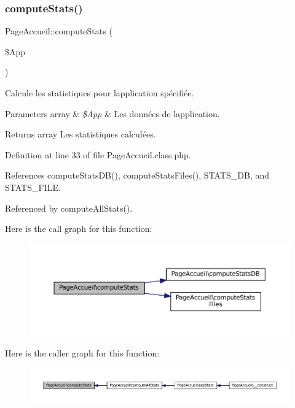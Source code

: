 \subsubsection{\texorpdfstring{compute\+Stats()}{computeStats()}}
{\footnotesize\ttfamily Page\+Accueil\+::compute\+Stats (\begin{DoxyParamCaption}\item[{}]{\$\+App }\end{DoxyParamCaption})\hspace{0.3cm}{\ttfamily [protected]}}

Calcule les statistiques pour l\textquotesingle{}application spécifiée.


\begin{DoxyParams}[1]{Parameters}
array & {\em \$\+App} & Les données de l\textquotesingle{}application. \\
\hline
\end{DoxyParams}
\begin{DoxyReturn}{Returns}
array Les statistiques calculées. 
\end{DoxyReturn}


Definition at line 33 of file Page\+Accueil.\+class.\+php.



References compute\+Stats\+D\+B(), compute\+Stats\+Files(), S\+T\+A\+T\+S\+\_\+\+DB, and S\+T\+A\+T\+S\+\_\+\+F\+I\+LE.



Referenced by compute\+All\+Stats().

Here is the call graph for this function\+:\nopagebreak
\begin{figure}[H]
\begin{center}
\leavevmode
\includegraphics[width=350pt]{class_page_accueil_a98f6fc9d30fc6ce0e44230887a2f2958_cgraph}
\end{center}
\end{figure}
Here is the caller graph for this function\+:\nopagebreak
\begin{figure}[H]
\begin{center}
\leavevmode
\includegraphics[width=350pt]{class_page_accueil_a98f6fc9d30fc6ce0e44230887a2f2958_icgraph}
\end{center}
\end{figure}
\mbox{\label{class_page_accueil_a9799218ddbc6dcdbc471e2a99efbe61a}} 
